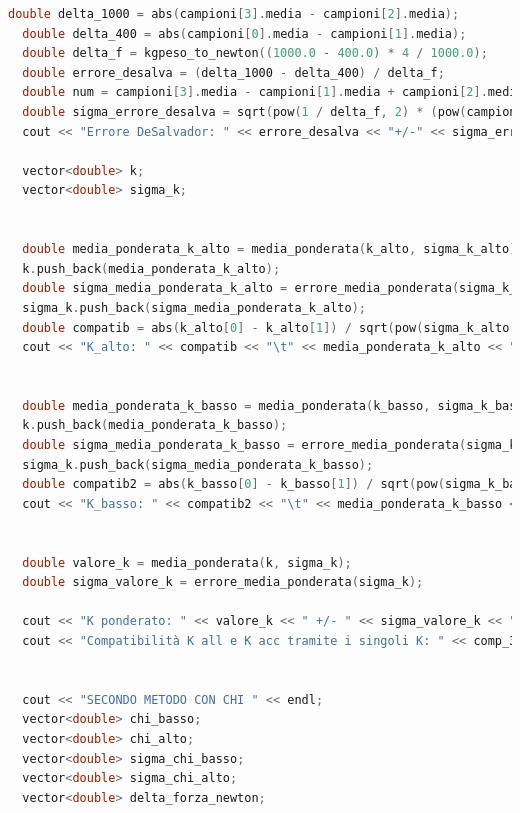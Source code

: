 \documentclass[a4paper,11pt,oneside]{article}
\begin{document}
\begin{lstlisting}[language=C++, label=lst:analisi_2ac, caption=analisi\_2ac]
  double delta_1000 = abs(campioni[3].media - campioni[2].media);
  double delta_400 = abs(campioni[0].media - campioni[1].media);
  double delta_f = kgpeso_to_newton((1000.0 - 400.0) * 4 / 1000.0);
  double errore_desalva = (delta_1000 - delta_400) / delta_f;
  double num = campioni[3].media - campioni[1].media + campioni[2].media - campioni[0].media;
  double sigma_errore_desalva = sqrt(pow(1 / delta_f, 2) * (pow(campioni[0].dstd_media, 2) + pow(campioni[1].dstd_media, 2) + pow(campioni[2].dstd_media, 2) + pow(campioni[3].dstd_media, 2)) + 2 * pow(num * sigma_delta_forza / pow(delta_f, 2), 2));
  cout << "Errore DeSalvador: " << errore_desalva << "+/-" << sigma_errore_desalva << "micron/Newton" << endl;
  
  vector<double> k;
  vector<double> sigma_k;

  
  double media_ponderata_k_alto = media_ponderata(k_alto, sigma_k_alto); 
  k.push_back(media_ponderata_k_alto);
  double sigma_media_ponderata_k_alto = errore_media_ponderata(sigma_k_alto); 
  sigma_k.push_back(sigma_media_ponderata_k_alto);
  double compatib = abs(k_alto[0] - k_alto[1]) / sqrt(pow(sigma_k_alto[0], 2) + pow(sigma_k_alto[1], 2));
  cout << "K_alto: " << compatib << "\t" << media_ponderata_k_alto << "\t" << sigma_media_ponderata_k_alto << endl;
  
  
  double media_ponderata_k_basso = media_ponderata(k_basso, sigma_k_basso);
  k.push_back(media_ponderata_k_basso);
  double sigma_media_ponderata_k_basso = errore_media_ponderata(sigma_k_basso);
  sigma_k.push_back(sigma_media_ponderata_k_basso);
  double compatib2 = abs(k_basso[0] - k_basso[1]) / sqrt(pow(sigma_k_basso[0], 2) + pow(sigma_k_basso[1], 2));
  cout << "K_basso: " << compatib2 << "\t" << media_ponderata_k_basso << "\t" << sigma_media_ponderata_k_basso << endl;
  
  
  double valore_k = media_ponderata(k, sigma_k);
  double sigma_valore_k = errore_media_ponderata(sigma_k);

  cout << "K ponderato: " << valore_k << " +/- " << sigma_valore_k << " micron/Newton" << endl;
  cout << "Compatibilità K all e K acc tramite i singoli K: " << comp_3(media_ponderata_k_alto, media_ponderata_k_basso, sigma_media_ponderata_k_alto, sigma_media_ponderata_k_basso) << endl;

  
  cout << "SECONDO METODO CON CHI " << endl;
  vector<double> chi_basso; 
  vector<double> chi_alto;  
  vector<double> sigma_chi_basso;
  vector<double> sigma_chi_alto;
  vector<double> delta_forza_newton;


\end{lstlisting}
\end{document}

